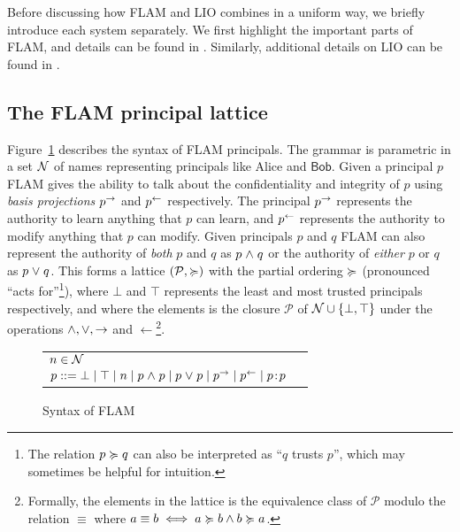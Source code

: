 Before discussing how FLAM and LIO combines in a uniform way, we briefly introduce each system separately. We first highlight the important parts of FLAM, and details can be found in \cite{Arden:2015:FA:2859845.2859998}. Similarly, additional details on LIO can be found in \cite{SRMMlio}.

\subsection{The FLAM principal lattice}
Figure~\ref{fig:flam-syntax} describes the syntax of FLAM principals. The grammar is parametric in a set $\mathcal{N}$ of names representing principals like Alice and $\mathsf{Bob}$. Given a principal $p$ FLAM gives the ability to talk about the confidentiality and integrity of $p$ using \emph{basis projections} $p^{\rightarrow}$ and $p^{\leftarrow}$ respectively. The principal $p^{\rightarrow}$ represents the authority to learn anything that $p$ can learn, and $p^{\leftarrow}$ represents the authority to modify anything that $p$ can modify. Given principals $p$ and $q$ FLAM can also represent the authority of \emph{both} $p$ and $q$ as $p \mathrel{\land} q$ or the authority of \emph{either} $p$ or $q$ as $p \mathrel{\lor} q$. This forms a lattice $(\mathcal{P}, \succcurlyeq)$ with the partial ordering $\succcurlyeq$ (pronounced ``acts for''\footnote{The relation $p \succcurlyeq q$ can also be interpreted as ``$q$ trusts $p$'', which may sometimes be helpful for intuition.}), where $\bot$ and $\top$ represents the least and most trusted principals respectively, and where the elements is the closure $\mathcal{P}$ of $\mathcal{N} \cup \{\bot, \top\}$ under the operations $\mathrel{\land}, \mathrel{\lor}, \rightarrow$ and $\leftarrow$\footnote{Formally, the elements in the lattice is the equivalence class of $\mathcal{P}$ modulo the relation $\equiv$ where $a \equiv b \iff a \succcurlyeq b \wedge b \succcurlyeq a$.}.

\begin{figure}
    \centering
    \begin{tabular}{ll}
    $n \in \mathcal{N}$ \\
    $p ::= \bot \mid \top \mid n \mid p \mathrel{\land} p \mid p \mathrel{\lor} p \mid p^{\rightarrow} \mid p^{\leftarrow} \mid p\!:\!p$
    \end{tabular}
    \caption{Syntax of FLAM}
    \label{fig:flam-syntax}
\end{figure}

